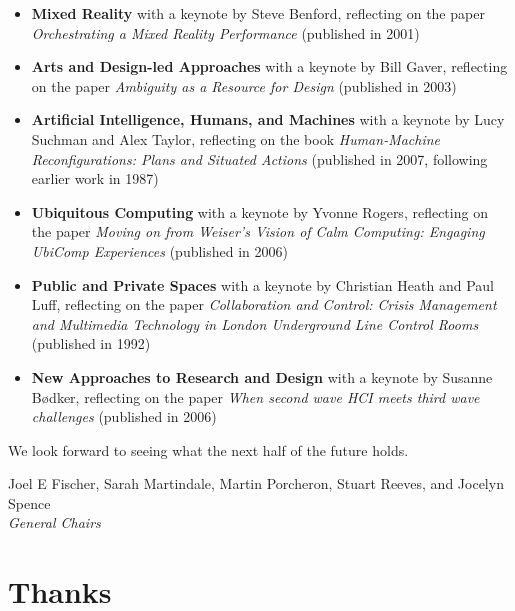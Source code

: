 \documentclass[a4paper,oneside]{memoir}
\begin{document}
\begin{itemize}
    \item \textbf{Mixed Reality} with a keynote by Steve Benford, reflecting on the paper \textit{Orchestrating a Mixed Reality Performance} (published in 2001)

    \item \textbf{Arts and Design-led Approaches} with a keynote by Bill Gaver, reflecting on the paper \textit{Ambiguity as a Resource for Design} (published in 2003)

    \item \textbf{Artificial Intelligence, Humans, and Machines} with a keynote by Lucy Suchman and Alex Taylor, reflecting on the book \textit{Human-Machine Reconfigurations: Plans and Situated Actions} (published in 2007, following earlier work in 1987)

    \item \textbf{Ubiquitous Computing} with a keynote by Yvonne Rogers, reflecting on the paper \textit{Moving on from Weiser’s Vision of Calm Computing: Engaging UbiComp Experiences} (published in 2006)

    \item \textbf{Public and Private Spaces} with a keynote by Christian Heath and Paul Luff, reflecting on the paper \textit{Collaboration and Control: Crisis Management and Multimedia Technology in London Underground Line Control Rooms} (published in 1992)
    
    \item \textbf{New Approaches to Research and Design} with a keynote by Susanne Bødker, reflecting on the paper \textit{When second wave HCI meets third wave challenges} (published in 2006)
\end{itemize}

\noindent{}We look forward to seeing what the next half of the future holds.

\vspace{.5cm}

\noindent{}Joel E Fischer, Sarah Martindale, Martin Porcheron, Stuart Reeves, and Jocelyn Spence\\
\textit{General Chairs}

\chapter{Thanks}

\end{document}
